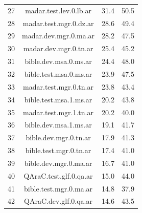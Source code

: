 \begin{table}[htbp]
\begin{tabular}{l@{\hspace{3pt}}c@{\hspace{3pt}}c@{\hspace{3pt}}c}
27 & madar.test.lev.0.lb.ar & 31.4 & 50.5 \\
28 & madar.test.mgr.0.dz.ar & 28.6 & 49.4 \\
29 & madar.dev.mgr.0.ma.ar & 28.2 & 47.5 \\
30 & madar.dev.mgr.0.tn.ar & 25.4 & 45.2 \\
31 & bible.dev.msa.0.ms.ar & 24.4 & 48.0 \\
32 & bible.test.msa.0.ms.ar & 23.9 & 47.5 \\
33 & madar.test.mgr.0.tn.ar & 23.8 & 43.4 \\
34 & bible.test.msa.1.ms.ar & 20.2 & 43.8 \\
35 & madar.test.mgr.1.tn.ar & 20.2 & 40.0 \\
36 & bible.dev.msa.1.ms.ar & 19.1 & 41.7 \\
37 & bible.dev.mgr.0.tn.ar & 17.9 & 41.3 \\
38 & bible.test.mgr.0.tn.ar & 17.4 & 41.0 \\
39 & bible.dev.mgr.0.ma.ar & 16.7 & 41.0 \\
40 & QAraC.test.glf.0.qa.ar & 15.0 & 44.0 \\
41 & bible.test.mgr.0.ma.ar & 14.8 & 37.9 \\
42 & QAraC.dev.glf.0.qa.ar & 14.6 & 43.5 \\
\bottomrule
\end{tabular}
\end{table}